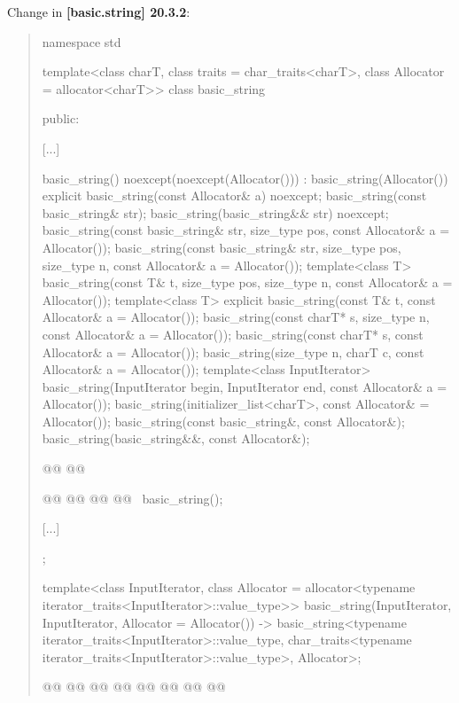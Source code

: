 \documentclass{wg21}
\begin{document}
Change in \textbf{[basic.string] 20.3.2}:
\begin{quote}
\begin{codeblock}
namespace std {
template<class charT, class traits = char_traits<charT>,
class Allocator = allocator<charT>>
class basic_string {
    public:

    [...]

    basic_string() noexcept(noexcept(Allocator())) : basic_string(Allocator()) { }
    explicit basic_string(const Allocator& a) noexcept;
    basic_string(const basic_string& str);
    basic_string(basic_string&& str) noexcept;
    basic_string(const basic_string& str, size_type pos, const Allocator& a = Allocator());
    basic_string(const basic_string& str, size_type pos, size_type n,
    const Allocator& a = Allocator());
    template<class T>
    basic_string(const T& t, size_type pos, size_type n, const Allocator& a = Allocator());
    template<class T>
    explicit basic_string(const T& t, const Allocator& a = Allocator());
    basic_string(const charT* s, size_type n, const Allocator& a = Allocator());
    basic_string(const charT* s, const Allocator& a = Allocator());
    basic_string(size_type n, charT c, const Allocator& a = Allocator());
    template<class InputIterator>
    basic_string(InputIterator begin, InputIterator end, const Allocator& a = Allocator());
    basic_string(initializer_list<charT>, const Allocator& = Allocator());
    basic_string(const basic_string&, const Allocator&);
    basic_string(basic_string&&, const Allocator&);

    @@
    @@

    @@
    @@
    @@
    @@
    ~basic_string();

    [...]
};

template<class InputIterator,
class Allocator = allocator<typename iterator_traits<InputIterator>::value_type>>
basic_string(InputIterator, InputIterator, Allocator = Allocator())
-> basic_string<typename iterator_traits<InputIterator>::value_type,
char_traits<typename iterator_traits<InputIterator>::value_type>,
Allocator>;

@@
@@
@@
@@
@@
@@
@@
@\added{	>;}@

}
\end{codeblock}
\end{quote}
\end{document}
